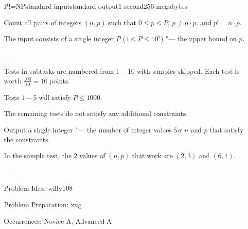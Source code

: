 \begin{problem}{P!=NP}{standard input}{standard output}{1 second}{256 megabytes}

Count all pairs of integers $(n, p)$ such that $0 \le p \le P$, $p \neq n \cdot p$, and $p!=n \cdot p$.

\InputFile
The input consists of a single integer $P$ ($1 \le P \le 10^5$) "--- the upper bound on $p$.

---

Tests in subtasks are numbered from $1 - 10$ with samples skipped. Each test is worth $\frac{100}{10}=10$ points.


Tests $1 - 5$ will satisfy $P \le 1000$.

The remaining tests do not satisfy any additional constraints.

\OutputFile
Output a single integer "--- the number of integer values for $n$ and $p$ that satisfy the constraints.

\Example

\begin{example}
%
\end{example}

\Note
In the sample test, the $2$ values of $(n,p)$ that work are $(2,3)$ and $(6,4)$.

---

Problem Idea: willy108

Problem Preparation: xug

Occurrences: Novice A, Advanced A

\end{problem}

